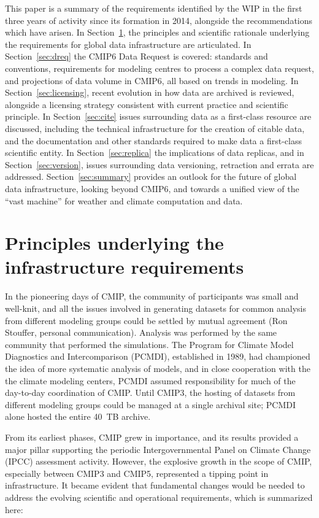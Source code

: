 \documentclass[gmd,manuscript]{copernicus}
\newcommand{\secref}[1] {\mbox{Section  \ref{sec:#1}}}
\begin{document}
This paper is a summary of the requirements identified by the WIP in
the first three years of activity since its formation in 2014,
alongside the recommendations which have arisen. In
\secref{principles}, the principles and scientific rationale
underlying the requirements for global data infrastructure are
articulated. In \secref{dreq} the CMIP6 Data Request is covered:
standards and conventions, requirements for modeling centres to
process a complex data request, and projections of data volume in
CMIP6, all based on trends in modeling. In \secref{licensing}, recent
evolution in how data are archived is reviewed, alongside a licensing
strategy consistent with current practice and scientific principle. In
\secref{cite} issues surrounding data as a first-class resource are
discussed, including the technical infrastructure for the creation of
citable data, and the documentation and other standards required to
make data a first-class scientific entity. In \secref{replica} the
implications of data replicas, and in \secref{version}, issues
surrounding data versioning, retraction and errata are addressed.
\secref{summary} provides an outlook for the future of global data
infrastructure, looking beyond CMIP6, and towards a unified view of
the ``vast machine'' for weather and climate computation and data.

\section{Principles underlying the infrastructure requirements}
\label{sec:principles}

In the pioneering days of CMIP, the community of participants was
small and well-knit, and all the issues involved in generating
datasets for common analysis from different modeling groups could be
settled by mutual agreement (Ron Stouffer, personal communication).
Analysis was performed by the same community that performed the
simulations. The Program for Climate Model Diagnostics and
Intercomparison (PCMDI), established in 1989, had championed the idea
of more systematic analysis of models, and in close cooperation with
the the climate modeling centers, PCMDI assumed responsibility for
much of the day-to-day coordination of CMIP. Until CMIP3, the hosting
of datasets from different modeling groups could be managed at a
single archival site; PCMDI alone hosted the entire 40~TB archive.

From its earliest phases, CMIP grew in importance, and its results
provided a major pillar supporting the periodic Intergovernmental
Panel on Climate Change (IPCC) assessment activity. However, the
explosive growth in the scope of CMIP, especially between CMIP3 and
CMIP5, represented a tipping point in infrastructure. It became
evident that fundamental changes would be needed to address the
evolving scientific and operational requirements, which is summarized
here:
\end{document}
